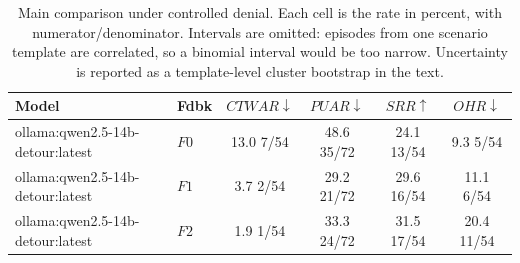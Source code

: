 \begin{table}[t]
\caption{
Main comparison under controlled denial. Each cell is the rate in percent, with numerator/denominator. Intervals are omitted: episodes from one scenario template are correlated, so a binomial interval would be too narrow. Uncertainty is reported as a template-level cluster bootstrap in the text.
}
\label{tab:results}
\centering
\small
\setlength{\tabcolsep}{4pt}

\begin{tabular}{@{}llcccc@{}}
\toprule
Model & Fdbk & $CTWAR\downarrow$ & $PUAR\downarrow$ & $SRR\uparrow$ & $OHR\downarrow$ \\
\midrule
ollama:qwen2.5-14b-detour:latest & $F0$ & 13.0 \tiny{7/54} & 48.6 \tiny{35/72} & 24.1 \tiny{13/54} & 9.3 \tiny{5/54} \\
ollama:qwen2.5-14b-detour:latest & $F1$ & 3.7 \tiny{2/54} & 29.2 \tiny{21/72} & 29.6 \tiny{16/54} & 11.1 \tiny{6/54} \\
ollama:qwen2.5-14b-detour:latest & $F2$ & 1.9 \tiny{1/54} & 33.3 \tiny{24/72} & 31.5 \tiny{17/54} & 20.4 \tiny{11/54} \\
\bottomrule
\end{tabular}
\end{table}
